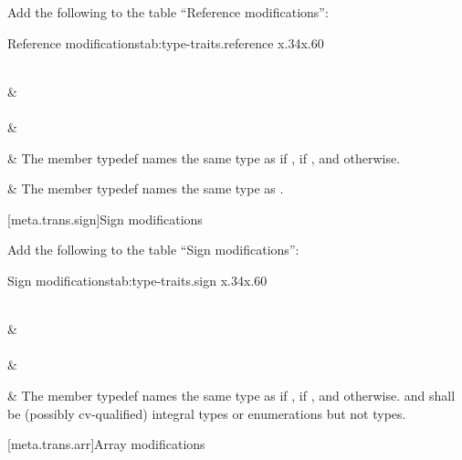 \documentclass[ebook,10pt,oneside,openany,final]{memoir}
\newenvironment{libreqtab2b}[2]
{
 \begin{LongTable}
 {#1}{#2}
 {x{.34\hsize}x{.60\hsize}}
}
{
 \end{LongTable}
}
\begin{document}
\pnum
Add the following to the table ``Reference modifications'':

\begin{libreqtab2b}{Reference modifications}{tab:type-traits.reference}
\\ \topline
{} &    \\ \capsep
\endfirsthead
\continuedcaption\\
\topline
{} &    \\ \capsep
\endhead

%
 &
The member typedef  names the same type as  if ,  if , and  otherwise.
\\ \rowsep

%
 &
The member typedef  names the same type as .
\\
\end{libreqtab2b}

[meta.trans.sign]{Sign modifications}

\pnum
Add the following to the table ``Sign modifications'':

\begin{libreqtab2b}{Sign modifications}{tab:type-traits.sign}
\\ \topline
{} &    \\ \capsep
\endfirsthead
\continuedcaption\\
\topline
{} &    \\ \capsep
\endhead

%
 &
The member typedef  names the same type as  if ,  if , and  otherwise.\br
\requires{}  and  shall be (possibly cv-qualified) integral types or enumerations but not  types.
\\
\end{libreqtab2b}
[meta.trans.arr]{Array modifications}
\end{document}
